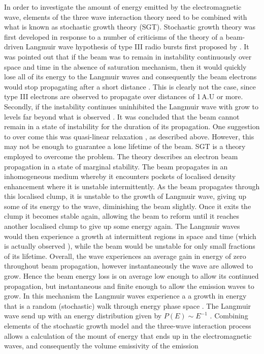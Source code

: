 In order to investigate the amount of energy emitted by the electromagnetic wave, elements of the three wave interaction theory need to be combined with what is known as stochastic growth theory \citep{robinson1993a}(SGT). Stochastic growth theory was first developed in response to a number of criticisms of the theory of a beam-driven Langmuir wave hypothesis of type III radio bursts first proposed by \citet{ginzburg1958}. It was pointed out that if the beam was to remain in instability continuously over space and time in the absence of saturation mechanism, then it would quickly lose all of its energy to the Langmuir waves and consequently the beam electrons would stop propagating after a short distance \citep{sturrock1964}. This is clearly not the case, since type III electrons are observed to propagate over distances of 1\,A.U or more. Secondly, if the instability continues uninhibited the Langmuir wave with grow to levels far beyond what is observed \citep{smith1979}. It was concluded that the beam cannot remain in a state of instability for the duration of its propagation. One suggestion to over come this was quasi-linear relaxation \citep{grognard1975}, as described above. However, this may not be enough to guarantee a lone lifetime of the beam. SGT is a theory employed to overcome the problem. The theory describes an electron beam propagation in a state of marginal stability. The beam propagates in an inhomogeneous medium whereby it encounters pockets of localised density enhancement where it is unstable intermittently. As the beam propagates through this localised clump, it is unstable to the growth of Langmuir wave, giving up some of its energy to the wave, diminishing the beam slightly. Once it exits the clump it becomes stable again, allowing the beam to reform until it reaches another localised clump to give up some energy again. The Langmuir waves would then experience a growth at intermittent regions in space and time (which is actually observed \citep{lin1986}), while the beam would be unstable for only small fractions of its lifetime. Overall, the wave experiences an average gain in energy of zero throughout beam propagation, however instantaneously the wave are allowed to grow. Hence the beam energy loss is on average low enough to allow its continued propagation, but instantaneous and finite enough to allow the emission waves to grow. In this mechanism the Langmuir waves experience a a growth in energy that is a random (stochastic) walk through energy phase space \citep{robinson1992}.  The Langmuir wave send up with an energy distribution given by $P(E)\sim E^{-1}$ \citep{robinson1993a}.  Combining elements of the stochastic growth model and the three-wave interaction process allows a calculation of the mount of energy that ends up in the electromagnetic waves, and consequently the volume emissivity of the emission \citep{robinson1993a, robinson1998}
